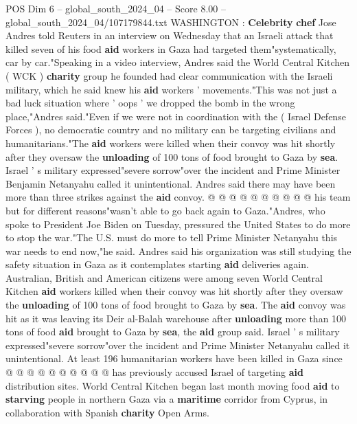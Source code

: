 \begin{textsample}{POS Dim 6 – global\_south\_2024\_04 – Score 8.00 – global\_south\_2024\_04/107179844.txt}  \label{ex:f6_pos_086}
WASHINGTON : \textbf{Celebrity} \textbf{chef} Jose Andres told Reuters in an interview on Wednesday that an Israeli attack that killed seven of his food \textbf{aid} workers in Gaza had targeted them"systematically, car by car."Speaking in a video interview, Andres said the World Central Kitchen ( WCK ) \textbf{charity} group he founded had clear communication with the Israeli military, which he said knew his \textbf{aid} workers ' movements."This was not just a bad luck situation where ' oops ' we dropped the bomb in the wrong place,"Andres said."Even if we were not in coordination with the ( Israel Defense Forces ), no democratic country and no military can be targeting civilians and humanitarians."The \textbf{aid} workers were killed when their convoy was hit shortly after they oversaw the \textbf{unloading} of 100 tons of food brought to Gaza by \textbf{sea}.
Israel ' s military expressed"severe sorrow"over the incident and Prime Minister Benjamin Netanyahu called it unintentional.
Andres said there may have been more than three strikes against the \textbf{aid} convoy. @ @ @ @ @ @ @ @ @ @ his team but for different reasons"wasn't able to go back again to Gaza."Andres, who spoke to President Joe Biden on Tuesday, pressured the United States to do more to stop the war."The U.S. must do more to tell Prime Minister Netanyahu this war needs to end now,"he said.
Andres said his organization was still studying the safety situation in Gaza as it contemplates starting \textbf{aid} deliveries again.
Australian, British and American citizens were among seven World Central Kitchen \textbf{aid} workers killed when their convoy was hit shortly after they oversaw the \textbf{unloading} of 100 tons of food brought to Gaza by \textbf{sea}.
The \textbf{aid} convoy was hit as it was leaving its Deir al-Balah warehouse after \textbf{unloading} more than 100 tons of food \textbf{aid} brought to Gaza by \textbf{sea}, the \textbf{aid} group said.
Israel ' s military expressed"severe sorrow"over the incident and Prime Minister Netanyahu called it unintentional.
At least 196 humanitarian workers have been killed in Gaza since @ @ @ @ @ @ @ @ @ @ has previously accused Israel of targeting \textbf{aid} distribution sites.
World Central Kitchen began last month moving food \textbf{aid} to \textbf{starving} people in northern Gaza via a \textbf{maritime} corridor from Cyprus, in collaboration with Spanish \textbf{charity} Open Arms.

\end{textsample}

